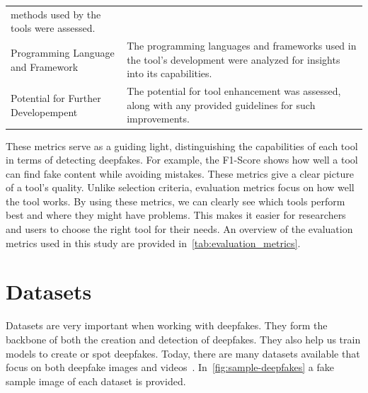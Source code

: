 \begin{table}[htpb]
\begin{tabularx}{\textwidth}{l X}
		methods used by the tools were assessed.                                                \\
		\addlinespace
		Programming Language and Framework  & The programming languages and frameworks used
		in the tool's development were analyzed for insights into its capabilities.             \\
		\addlinespace
		Potential for Further Developempent & The potential for tool enhancement was assessed,
		along with any provided guidelines for such improvements.                               \\
		\bottomrule
	\end{tabularx}
\end{table}

These metrics serve as a guiding light, distinguishing the capabilities of each tool
in terms of detecting deepfakes. For example, the F1-Score shows how well a tool can
find fake content while avoiding mistakes. These metrics give a clear picture of a
tool's quality. Unlike selection criteria, evaluation metrics focus on how well the
tool works. By using these metrics, we can clearly see which tools perform best and
where they might have problems. This makes it easier for researchers and users to
choose the right tool for their needs.
An overview of the evaluation metrics used in this study are provided in~\autoref{tab:evaluation_metrics}.

\section{Datasets}
Datasets are very important when working with deepfakes. They form the backbone of both
the creation and detection of deepfakes. They also help us train models to create or spot
deepfakes. Today, there are many datasets available that focus on both deepfake images
and videos~\cite{deepfake-dataset,zi2020wilddeepfake,10.1145/3531536.3532946}.
In~\autoref{fig:sample-deepfakes} a fake sample image of each dataset is provided.

